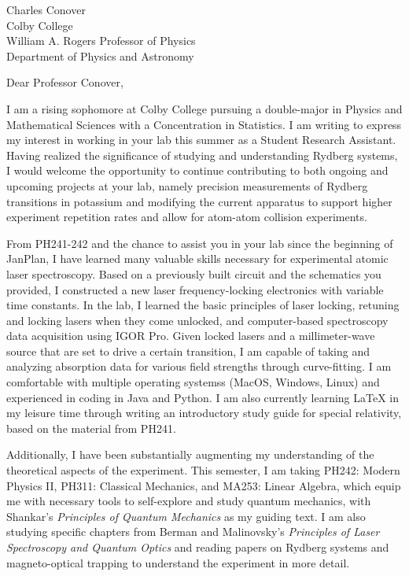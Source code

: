 \documentclass{letter}
\begin{document}
	\begin{letter}{Charles Conover \\Colby College\\William A. Rogers Professor of Physics\\ Department of Physics and Astronomy}
		\opening{Dear Professor Conover,}
		I am a rising sophomore at Colby College pursuing a double-major in Physics and Mathematical Sciences with a Concentration in Statistics. I am writing to express my interest in working in your lab this summer as a Student Research Assistant. Having realized the significance of studying and understanding Rydberg systems, I would welcome the opportunity to continue contributing to both ongoing and upcoming projects at your lab, namely precision measurements of Rydberg transitions in potassium and modifying the current apparatus to support higher experiment repetition rates and allow for atom-atom collision experiments.
		
		From PH241-242 and the chance to assist you in your lab since the beginning of JanPlan, I have learned many valuable skills necessary for experimental atomic laser spectroscopy. Based on a previously built circuit and the schematics you provided, I constructed a new laser frequency-locking electronics with variable time constants. In the lab, I learned the basic principles of laser locking, retuning and locking lasers when they come unlocked, and computer-based spectroscopy data acquisition using IGOR Pro. Given locked lasers and a millimeter-wave source that are set to drive a certain transition, I am capable of taking and analyzing absorption data for various field strengths through curve-fitting. I am comfortable with multiple operating systemss (MacOS, Windows, Linux) and experienced in coding in Java and Python. I am also currently learning \LaTeX{} in my leisure time through writing an introductory study guide for special relativity, based on the material from PH241. 
		
		Additionally, I have been substantially augmenting my understanding of the theoretical aspects of the experiment. This semester, I am taking PH242: Modern Physics II, PH311: Classical Mechanics, and MA253: Linear Algebra, which equip me with necessary tools to self-explore and study quantum mechanics, with Shankar's \textit{Principles of Quantum Mechanics} as my guiding text. I am also studying specific chapters from Berman and Malinovsky's \textit{Principles of Laser Spectroscopy and Quantum Optics} and reading papers on Rydberg systems and magneto-optical trapping to understand the experiment in more detail. 
	

\end{letter}
\end{document}

